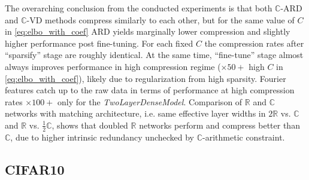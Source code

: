 \documentclass{article}
\newcommand{\real}{\mathbb{R}}
\newcommand{\cplx}{\mathbb{C}}
\begin{document}
The overarching conclusion from the conducted experiments is that both $\cplx$-ARD and
$\cplx$-VD methods compress similarly to each other, but for the same value of $C$ in
\eqref{eq:elbo_with_coef} ARD yields marginally lower compression and slightly higher
performance post fine-tuning. For each fixed $C$ the compression rates after ``sparsify''
stage are roughly identical.
%
%
At the same time, ``fine-tune'' stage almost always improves performance in high compression
regime ($\times50+$ high $C$ in \eqref{eq:elbo_with_coef}), likely due to regularization from
high sparsity.
Fourier features catch up to the raw data in terms of performance at high compression
rates $\times100+$ only for the \emph{TwoLayerDenseModel}.
%
Comparison of $\real$ and $\cplx$ networks with matching architecture, i.e. same effective
layer widths in $2\real$ vs. $\cplx$ and $\real$ vs. $\tfrac12\cplx$, shows that doubled
$\real$ networks perform and compress better than $\cplx$, due to higher intrinsic redundancy
unchecked by $\cplx$-arithmetic constraint.



\subsection{CIFAR10} %
\label{sub:cifar10}
\end{document}
